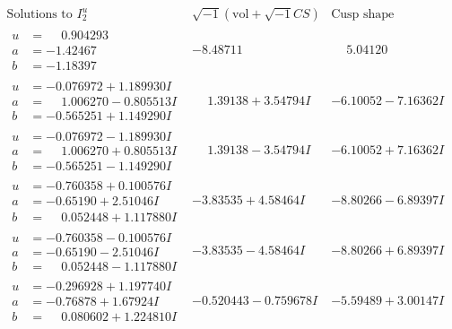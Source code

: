 \documentclass[1p]{elsarticle_modified}
\theoremstyle{definition}
\newcommand{\I}{\sqrt{-1}}
\begin{document}
$$\begin{array}{c|c|c}  
\text{Solutions to }I^u_{2}& \I (\text{vol} + \sqrt{-1}CS) & \text{Cusp shape}\\
 \hline 
\begin{aligned}
u &= \phantom{-}0.904293\phantom{ +0.000000I} \\
a &= -1.42467\phantom{ +0.000000I} \\
b &= -1.18397\phantom{ +0.000000I}\end{aligned}
 & -8.48711\phantom{ +0.000000I} & \phantom{-}5.04120\phantom{ +0.000000I} \\ \hline\begin{aligned}
u &= -0.076972 + 1.189930 I \\
a &= \phantom{-}1.006270 - 0.805513 I \\
b &= -0.565251 + 1.149290 I\end{aligned}
 & \phantom{-}1.39138 + 3.54794 I & -6.10052 - 7.16362 I \\ \hline\begin{aligned}
u &= -0.076972 - 1.189930 I \\
a &= \phantom{-}1.006270 + 0.805513 I \\
b &= -0.565251 - 1.149290 I\end{aligned}
 & \phantom{-}1.39138 - 3.54794 I & -6.10052 + 7.16362 I \\ \hline\begin{aligned}
u &= -0.760358 + 0.100576 I \\
a &= -0.65190 + 2.51046 I \\
b &= \phantom{-}0.052448 + 1.117880 I\end{aligned}
 & -3.83535 + 4.58464 I & -8.80266 - 6.89397 I \\ \hline\begin{aligned}
u &= -0.760358 - 0.100576 I \\
a &= -0.65190 - 2.51046 I \\
b &= \phantom{-}0.052448 - 1.117880 I\end{aligned}
 & -3.83535 - 4.58464 I & -8.80266 + 6.89397 I \\ \hline\begin{aligned}
u &= -0.296928 + 1.197740 I \\
a &= -0.76878 + 1.67924 I \\
b &= \phantom{-}0.080602 + 1.224810 I\end{aligned}
 & -0.520443 - 0.759678 I & -5.59489 + 3.00147 I \\ \hline\begin{aligned}

\end{aligned}
\end{array}$$
\end{document}
